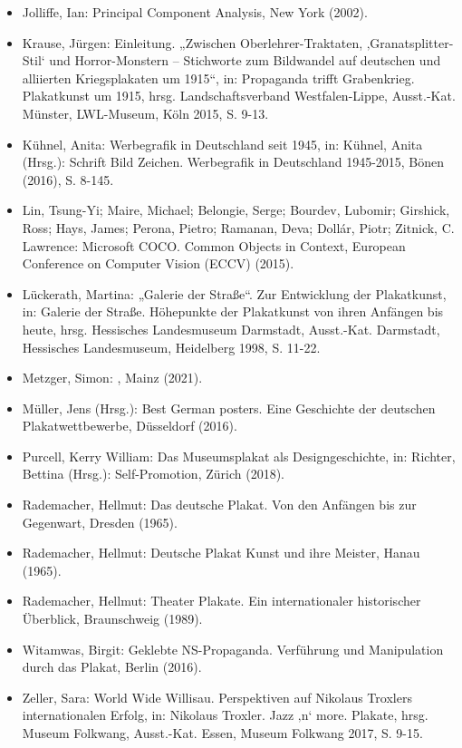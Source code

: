 \documentclass[a4paper,12pt,ngerman]{article}
\begin{document}
\begin{itemize}
\item Jolliffe, Ian: Principal Component Analysis, New York (2002).
\item Krause, Jürgen: Einleitung. „Zwischen Oberlehrer-Traktaten, ‚Granatsplitter-Stil‘ und Horror-Monstern – Stichworte zum Bildwandel auf deutschen und alliierten Kriegsplakaten um 1915“, in: Propaganda trifft Grabenkrieg. Plakatkunst um 1915, hrsg. Landschaftsverband Westfalen-Lippe, Ausst.-Kat. Münster, LWL-Museum, Köln 2015, S. 9-13.
\item Kühnel, Anita: Werbegrafik in Deutschland seit 1945, in: Kühnel, Anita (Hrsg.): Schrift Bild Zeichen. Werbegrafik in Deutschland 1945-2015, Bönen (2016), S. 8-145.
\item Lin, Tsung-Yi; Maire, Michael; Belongie, Serge; Bourdev, Lubomir; Girshick, Ross; Hays, James; Perona, Pietro; Ramanan, Deva; Dollár, Piotr; Zitnick, C. Lawrence: Microsoft COCO. Common Objects in Context, European Conference on Computer Vision (ECCV) (2015).
\item Lückerath, Martina: „Galerie der Straße“. Zur Entwicklung der Plakatkunst, in: Galerie der Straße. Höhepunkte der Plakatkunst von ihren Anfängen bis heute, hrsg. Hessisches Landesmuseum Darmstadt, Ausst.-Kat. Darmstadt, Hessisches Landesmuseum, Heidelberg 1998, S. 11-22.
\item Metzger, Simon: , Mainz (2021).
\item Müller, Jens (Hrsg.): Best German posters. Eine Geschichte der deutschen Plakatwettbewerbe, Düsseldorf (2016).
\item Purcell, Kerry William: Das Museumsplakat als Designgeschichte, in: Richter, Bettina (Hrsg.): Self-Promotion, Zürich (2018).
\item Rademacher, Hellmut: Das deutsche Plakat. Von den Anfängen bis zur Gegenwart, Dresden (1965).
\item Rademacher, Hellmut: Deutsche Plakat Kunst und ihre Meister, Hanau (1965).
\item Rademacher, Hellmut: Theater Plakate. Ein internationaler historischer Überblick, Braunschweig (1989).
\item Witamwas, Birgit: Geklebte NS-Propaganda. Verführung und Manipulation durch das Plakat, Berlin (2016).
\item Zeller, Sara: World Wide Willisau. Perspektiven auf Nikolaus Troxlers internationalen Erfolg, in: Nikolaus Troxler. Jazz ‚n‘ more. Plakate, hrsg. Museum Folkwang, Ausst.-Kat. Essen, Museum Folkwang 2017, S. 9-15.

\end{itemize}

\end{document}
